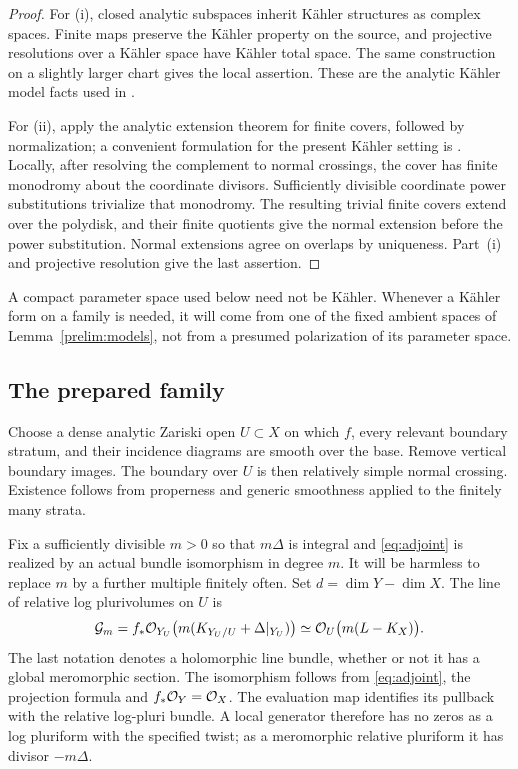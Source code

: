 \begin{proof}
For \textup{(i)}, closed analytic subspaces inherit K\"ahler
structures as complex spaces. Finite maps preserve the K\"ahler
property on the source, and projective resolutions over a K\"ahler
space have K\"ahler total space. The same construction on a slightly
larger chart gives the local assertion. These are the analytic
K\"ahler model facts used in \cite[Section~4]{Fujiki78}.

For \textup{(ii)}, apply the analytic extension theorem for finite
covers, followed by normalization; a convenient formulation for
the present K\"ahler setting is
\cite[version~1, Lemma~2.21]{Villadsen24}.
Locally, after resolving the complement to normal crossings, the
cover has finite monodromy about the coordinate divisors. Sufficiently
divisible coordinate power substitutions trivialize that monodromy.
The resulting trivial finite covers extend over the polydisk, and
their finite quotients give the normal extension before the power
substitution. Normal extensions agree on overlaps by uniqueness.
Part~\textup{(i)} and projective resolution give the last assertion.
\end{proof}

A compact parameter space used below need not be K\"ahler.
Whenever a K\"ahler form on a family is needed, it will come from
one of the fixed ambient spaces of Lemma~\ref{prelim:models},
not from a presumed polarization of its parameter space.

\subsection{The prepared family}

Choose a dense analytic Zariski open \(U\subset X\) on which
\(f\), every relevant boundary stratum, and their incidence diagrams
are smooth over the base. Remove vertical boundary images.
The boundary over \(U\) is then relatively simple normal crossing.
Existence follows from properness and generic smoothness applied
to the finitely many strata.

Fix a sufficiently divisible \(m>0\) so that \(m\Delta\) is integral
and \eqref{eq:adjoint} is realized by an actual bundle isomorphism
in degree \(m\). It will be harmless to replace \(m\) by a further
multiple finitely often. Set \(d=\dim Y-\dim X\).
The line of relative log plurivolumes on \(U\) is
\begin{equation}\label{eq:open-volume-line}
 \mathcal G_m
 =f_*\mathcal O_{Y_U}\bigl(m(K_{Y_U/U}+\Delta|_{Y_U})\bigr)
 \simeq \mathcal O_U\bigl(m(L-K_X)\bigr).
\end{equation}
The last notation denotes a holomorphic line bundle, whether or not
it has a global meromorphic section. The isomorphism follows from
\eqref{eq:adjoint}, the projection formula and
\(f_*\mathcal O_Y=\mathcal O_X\).
The evaluation map identifies its pullback with the relative
log-pluri bundle. A local generator therefore has no zeros as a
log pluriform with the specified twist; as a meromorphic relative
pluriform it has divisor \(-m\Delta\).

